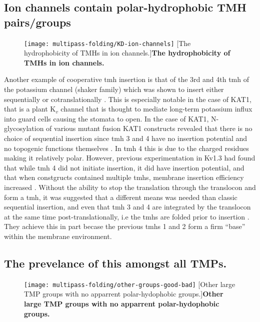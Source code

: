 \subsection{Ion channels contain polar-hydrophobic TMH pairs/groups}

\begin{figure}[!ht]
\centering
\texttt{[image: multipass-folding/KD-ion-channels]}
		[The hydrophobicity of TMHs in ion channels.]{\textbf{The hydrophobicity of TMHs in ion channels.}}

\label{fig:KD-ion-channels}
\end{figure}

Another example of cooperative \gls{tmh} insertion is that of the 3rd and 4th \gls{tmh} of the potassium channel (shaker family) which was shown to insert either sequentially or cotranslationally \cite{Zhang2007, Cymer2015}.
This is especially notable in the case of KAT1, that is a plant K$_v$ channel that is thought to mediate long-term potassium influx into guard cells causing the stomata to open.
In the case of KAT1, N-glycosylation of various mutant fusion KAT1 constructs revealed that there is no choice of sequential insertion since \gls{tmh} 3 and 4 have no insertion potential and no topogenic functions themselves \cite{Sato2002, Sato2003}.
In \gls{tmh} 4 this is due to the charged residues making it relatively polar.
However, previous experimentation in Kv1.3 had found that while \gls{tmh} 4 did not initiate insertion, it did have insertion potential, and that when constgructs contained multiple \gls{tmh}s, membrane insertion efficiency increased \cite{Tu2000}.
Without the ability to stop the translation through the translocon and form a \gls{tmh}, it was suggested that a different means was needed than classic sequential insertion, and even that \gls{tmh} 3 and 4 are integrated by the translocon at the same time post-translationally, i.e the \gls{tmh}s are folded prior to insertion \cite{Sato2003}.
They achieve this in part becase the previous \gls{tmh}s 1 and 2 form a firm ``base'' within the membrane environment.

\subsection{The prevelance of this amongst all TMPs.}


\begin{figure}[!ht]
\centering
\texttt{[image: multipass-folding/other-groups-good-bad]}
		[Other large TMP groups with no apparrent polar-hydophobic groups.]{\textbf{Other large TMP groups with no apparrent polar-hydophobic groups.}}

\label{fig:other-groups-good-bad}
\end{figure}

